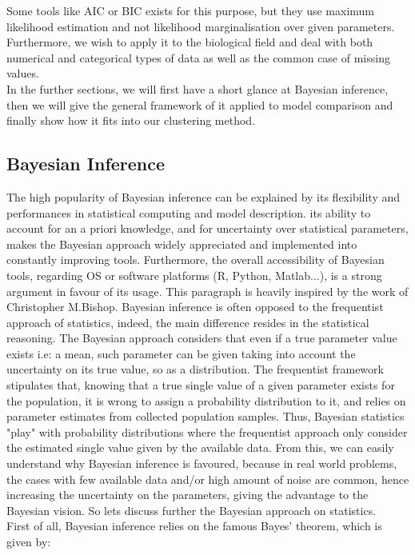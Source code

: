 \documentclass[twocolumn]{article}
\begin{document}
Some tools like AIC or BIC\cite{burnham} exists for this purpose, but they use maximum likelihood estimation and not likelihood marginalisation over given parameters. Furthermore, we wish to apply it to the biological field and deal with both numerical and categorical types of data as well as the common case of missing values.\\
In the further sections, we will first have a short glance at Bayesian inference, then we will give the general framework of it applied to model comparison and finally show how it fits into our clustering method.

\subsection{Bayesian Inference}

The high popularity of Bayesian inference can be explained by its flexibility and performances in statistical computing and model description. its ability to account for an a priori knowledge, and for uncertainty over statistical parameters, makes the Bayesian approach widely appreciated and implemented into constantly improving tools.
Furthermore, the overall accessibility of Bayesian tools, regarding OS or software platforms (R, Python, Matlab...), is a strong argument in favour of its usage.
This paragraph is heavily inspired by the work of Christopher M.Bishop\cite{bishop}.
Bayesian inference is often opposed to the frequentist approach of statistics, indeed, the main difference resides in the statistical reasoning.
The Bayesian approach considers that even if a true parameter value exists i.e: a mean, such parameter can be given taking into account the uncertainty on its true value, so as a distribution.
The frequentist framework stipulates that, knowing that a true single value of a given parameter exists for the population, it is wrong to assign a probability distribution to it, and relies on parameter estimates from collected population samples.
Thus, Bayesian statistics "play" with probability distributions where the frequentist approach only consider the estimated single value given by the available data.
From this, we can easily understand why Bayesian inference is favoured, because in real world problems, the cases with few available data and/or high amount of noise are common, hence increasing the uncertainty on the parameters, giving the advantage to the Bayesian vision.
So lets discuss further the Bayesian approach on statistics.\\
First of all, Bayesian inference relies on the famous Bayes' theorem, which is given by:
\end{document}
